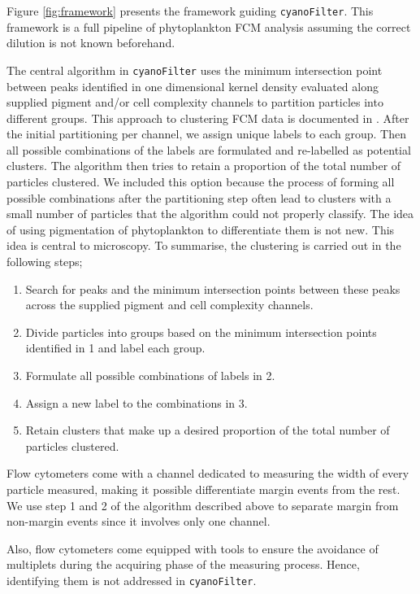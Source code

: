 \documentclass[a4paper,12pt]{extarticle}
\begin{document}
Figure \ref{fig:framework} presents the framework guiding \texttt{cyanoFilter}. This framework is a full pipeline of phytoplankton FCM analysis assuming the correct dilution is not known beforehand. 

The central algorithm in \texttt{cyanoFilter} uses the minimum intersection point between peaks identified in one dimensional kernel density evaluated along supplied pigment and/or cell complexity channels to partition particles into different groups. This approach to clustering FCM data is documented in \cite{Malek:2015a}. After the initial partitioning per channel, we assign unique labels to each group. Then all possible combinations of the labels are formulated and re-labelled as potential clusters. The algorithm then tries to retain a proportion of the total number of particles clustered. We included this option because the process of forming all possible combinations after the partitioning step often lead to clusters with a small number of particles that the algorithm could not properly classify. The idea of using pigmentation of phytoplankton to differentiate them is not new. This idea is central to microscopy. To summarise, the clustering is carried out in the following steps;

\begin{enumerate}
	\item Search for peaks and the minimum intersection points between these peaks across the supplied pigment and cell complexity channels.
	\item Divide particles into groups based on the minimum intersection points identified in 1 and label each group.
	\item Formulate all possible combinations of labels in 2.
	\item Assign a new label to the combinations in 3.
	\item Retain clusters that make up a desired proportion of the total number of particles clustered.
\end{enumerate}

Flow cytometers come with a channel dedicated to measuring the width of every particle measured, making it possible differentiate margin events from the rest. We use step 1 and 2 of the algorithm described above to separate margin from non-margin events since it involves only one channel. 

Also, flow cytometers come equipped with tools to ensure the avoidance of multiplets during the acquiring phase of the measuring process. Hence, identifying them is not addressed in \texttt{cyanoFilter}.
\end{document}

